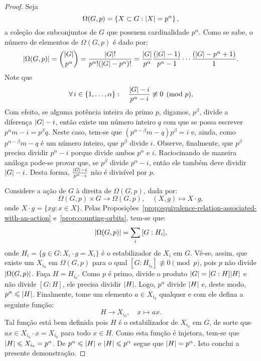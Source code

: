 \begin{proof}
  Seja
  \[
    \Omega(G,p)
    =
    \left\{
      X\subset{G}
      :
      \lvert X\rvert=p^{\alpha}
    \right\},
  \]
  a coleção dos subconjuntos de $G$ que possuem cardinalidade $p^{\alpha}$. Como se sabe, o número de elementos de $\Omega(G,p)$ é dado por:
  \[
    \lvert\Omega(G,p)\rvert
    =
    \binom{\lvert G\rvert}{p^{\alpha}}
    =
    \frac{\lvert G\rvert!}{p^{\alpha}!(\lvert G\rvert-p^{\alpha})!}
    =
    \frac{\lvert G\rvert}{p^{\alpha}}\frac{(\lvert G\rvert-1)}{p^{\alpha}-1}\cdots\frac{(\lvert G\rvert-p^{\alpha}+1)}{1}.
  \]
  Note que
  \[
    \forall\,i\in\{1,\ldots,\alpha\}:\quad
    \frac{\lvert G\rvert-i}{p^{\alpha}-i}\not\equiv{0}\pmod{p},
  \]
  Com efeito, se alguma potência inteira do primo $p$, digamos, $p^{\beta}$, divide a diferença $\lvert G\rvert-i$, então existe um número inteiro $q$ com que se possa escrever $p^{\alpha}m-i=p^{\beta}q$. Neste caso, tem-se que $(p^{\alpha-\beta}m-q)p^{\beta}=i$ e, ainda, como $p^{\alpha-\beta}m-q$ é um número inteiro, que $p^{\beta}$ divide $i$. Observe, finalmente, que $p^{\beta}$ precisa dividir $p^{\alpha}-i$ porque divide ambos $p^{\alpha}$ e $i$. Raciocinando de maneira análoga pode-se provar que, se $p^{\beta}$ divide $p^{\alpha}-i$, então ele também deve dividir $\lvert G\rvert-i$. Desta forma, $\frac{\lvert G\rvert-i}{p^{\alpha}-i}$ não é divisível por $p$.

  Considere a ação de $G$ à direita de $\Omega(G,p)$, dada por:
  \[
    \Omega(G,p)\times{G}\to\Omega(G,p),\quad{(X,g)\mapsto{X\cdot{g}}},
  \]
  onde $X\cdot{g}=\{xg:x\in{X}\}$. Pelas Proposições~\eqref{prop:equivalence-relation-associated-with-an-action} e~\eqref{prop:counting-orbits}, tem-se que:
  \[
    \lvert\Omega(G,p)\rvert=\sum_{i}\,[G:H_{i}],
  \]
  onde $H_{i}=\{g\in{G}:X_{i}\cdot{g}=X_{i}\}$ é o estabilizador de $X_{i}$ em $G$. Vê-se, assim, que existe um $X_{i_{0}}$ em $\Omega(G,p)$ para o qual $[G:H_{i_{0}}]\not\equiv{0}\pmod{p}$, pois $p$ não divide $\lvert\Omega(G,p)\rvert$. Faça $H=H_{i_{0}}$. Como $p$ é primo, divide o produto $\lvert G\rvert=[G:H]\lvert H\rvert$ e não divide $[G:H]$, ele precisa dividir $\lvert H\rvert$. Logo, $p^{\alpha}$ divide $\lvert H\rvert$ e, deste modo, $p^{\alpha}\leqslant\lvert H\rvert$. Finalmente, tome um elemento $a\in{X_{i_{0}}}$ qualquer e com ele defina a seguinte função:
  \[
    H\to{X_{i_{0}}},\quad{x\mapsto{ax}}.
  \]
  Tal função está bem definida pois $H$ é o estabilizador de $X_{i_{0}}$ em $G$, de sorte que $ax\in{X_{i_{0}}}\cdot{x}=X_{i_{0}}$ para todo $x\in{H}$. Como esta função é injetora, tem-se que $\lvert H\rvert\leqslant{X_{i_{0}}}=p^{\alpha}$. De $p^{\alpha}\leqslant\lvert H\rvert$ e $\lvert H\rvert\leqslant{p^{\alpha}}$ segue que $\lvert H\rvert=p^{\alpha}$. Isto conclui a presente demonstração.
\end{proof}

